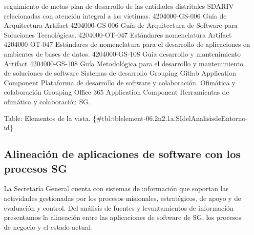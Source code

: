 \documentclass[
	a4paper, %
	12pt, %
]{include/CSSullivanBusinessReport}
\begin{document}
seguimiento de metas plan de desarrollo de las entidades distritales
SDARIV relacionadas con atención integral a las víctimas. \textbar{}
\textbar{} 4204000-GS-006 Guía de Arquitectura \textbar{} Artifact
\textbar{} 4204000-GS-006 Guía de Arquitectura de Software para
Soluciones Tecnológicas. \textbar{} \textbar{} 4204000-OT-047 Estándares
nomenclatura \textbar{} Artifact \textbar{} 4204000-OT-047 Estándares de
nomenclatura para el desarrollo de aplicaciones en ambientes de bases de
datos. \textbar{} \textbar{} 4204000-GS-108 Guía desarrollo y
mantenimiento \textbar{} Artifact \textbar{} 4204000-GS-108 Guía
Metodológica para el desarrollo y mantenimiento de soluciones de
software \textbar{} \textbar{} Sistemas de desarrollo \textbar{}
Grouping \textbar{} \textbar{} \textbar{} Gitlab \textbar{} Application
Component \textbar{} Plataforma de desarrollo de software y
colaboración. \textbar{} \textbar{} Ofimática y colaboración \textbar{}
Grouping \textbar{} \textbar{} \textbar{} Office 365 \textbar{}
Application Component \textbar{} Herramientas de ofimática y
colaboración SG. \textbar{}

Table: Elementos de la vista.
\{\#tbl:tblelement-06.2n2.1a.SIdelAnalisisdeEntorno-id\}

\subsection{Alineación de aplicaciones de software con los procesos
SG}\label{sec:alineaciuxf3n-de-aplicaciones-de-software-con-los-procesos-sg}

\begin{quote}
\end{quote}

La Secretaría General cuenta con sistemas de información que soportan
las actividades gestionadas por los procesos misionales, estratégicos,
de apoyo y de evaluación y control. Del análisis de fuentes y
levantamientos de información presentamos la alineación entre las
aplicaciones de software de SG, los procesos de negocio y el estado
actual.
\end{document}
